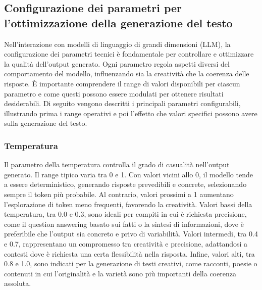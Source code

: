 \documentclass[target=mst,aauheader=,style=]{thud}
\begin{document}
\subsection{Configurazione dei parametri per l’ottimizzazione della generazione del testo}
Nell’interazione con modelli di linguaggio di grandi dimensioni (LLM), la configurazione dei parametri tecnici è fondamentale per controllare e ottimizzare la qualità dell’output generato. Ogni parametro regola aspetti diversi del comportamento del modello, influenzando sia la creatività che la coerenza delle risposte. È importante comprendere il range di valori disponibili per ciascun parametro e come questi possono essere modulati per ottenere risultati desiderabili.
Di seguito vengono descritti i principali parametri configurabili, illustrando prima i range operativi e poi l’effetto che valori specifici possono avere sulla generazione del testo.

\subsubsection{Temperatura}
Il parametro della temperatura controlla il grado di casualità nell’output generato. Il range tipico varia tra 0 e 1. Con valori vicini allo 0, il modello tende a essere deterministico, generando risposte prevedibili e concrete, selezionando sempre il token più probabile. Al contrario, valori prossimi a 1 aumentano l’esplorazione di token meno frequenti, favorendo la creatività.
Valori bassi della temperatura, tra 0.0 e 0.3, sono ideali per compiti in cui è richiesta precisione, come il question answering basato sui fatti o la sintesi di informazioni, dove è preferibile che l’output sia concreto e privo di variabilità. Valori intermedi, tra 0.4 e 0.7, rappresentano un compromesso tra creatività e precisione, adattandosi a contesti dove è richiesta una certa flessibilità nella risposta. Infine, valori alti, tra 0.8 e 1.0, sono indicati per la generazione di testi creativi, come racconti, poesie o contenuti in cui l’originalità e la varietà sono più importanti della coerenza assoluta.
\end{document}
